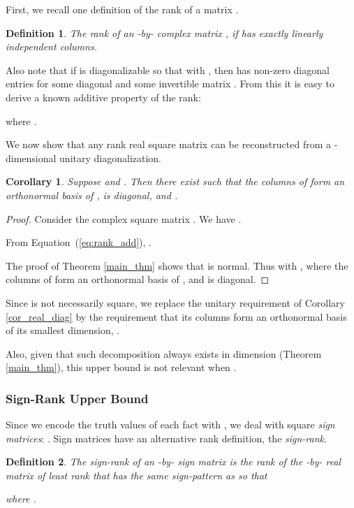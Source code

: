\documentclass[twoside,11pt]{article}
\renewcommand{\cite}{\citep}
\newtheorem{defn}{Definition}
\newtheorem{cor}{Corollary}
\begin{document}
First, we recall one definition of the rank of a matrix \cite{horn2012matrix}.

\begin{defn}
The rank of an -by- complex matrix , if 
 has exactly  linearly independent columns.
\end{defn}

Also note that if  is diagonalizable so that  with , then  has  non-zero diagonal entries for some diagonal  and some invertible matrix .
From this it is easy to derive a known additive property of the rank:

where .

We now show that any rank  real square matrix can be reconstructed 
from a -dimensional unitary diagonalization.

\begin{cor}
\label{cor_real_rank}
Suppose  and . Then there exist 
 such that the columns of  form an orthonormal basis of ,
 is diagonal, and .
\end{cor}


\begin{proof}
Consider the complex square matrix . We have .

From Equation~(\ref{eq:rank_add}), 
.



The proof of Theorem \ref{main_thm} shows that  is normal. Thus  with ,  where the columns of  form an orthonormal basis of , and  is diagonal.
\end{proof}

Since  is not necessarily square, we replace the unitary requirement of Corollary \ref{cor_real_diag}
by the requirement that its columns form an orthonormal basis of its smallest dimension, .


Also, given that such decomposition always exists in dimension  (Theorem \ref{main_thm}),
this upper bound is not relevant when .
    



\subsubsection{Sign-Rank Upper Bound}
Since we encode the truth values of each fact with , we deal with square \emph{sign matrices}:
. Sign matrices have an alternative rank definition, the \emph{sign-rank}.



\begin{defn}
The sign-rank   of an -by- sign matrix  is the rank of
the -by- real matrix of least rank that has the same sign-pattern as  so that

where . 
\end{defn}
\end{document}

